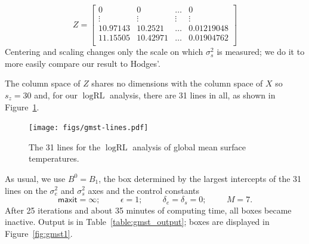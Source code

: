 \documentclass{report}
\newcommand{\textcompute}{\textsf}
\newcommand{\RLorig}{\text{RL}}
\newcommand{\logRLorig}{\log\RLorig}
\newcommand{\sigssq}{\sigma_s^2}
\newcommand{\sigesq}{\sigma_e^2}
\newcommand{\maxit}{\textcompute{maxit}}
\begin{document}
\begin{equation*}
Z =	\begin{bmatrix} 
		0 & 0 & \dots & 0\\
		\vdots & \vdots & \vdots & \vdots\\
		10.97143 & 10.2521 & \dots & 0.01219048\\
		11.15505 & 10.42971 & \dots & 0.01904762\\
	\end{bmatrix}
\end{equation*}
Centering and scaling changes only the scale on which $\sigssq$ is measured; we do it to more easily compare our result to Hodges'.

The column space of $Z$ shares no dimensions with the column space of $X$ so $s_z=30$ and, for our $\logRLorig$ analysis, there are 31 lines in all, as shown in Figure~\ref{fig:gmst-lines}.
\begin{figure}
	\centering
	\texttt{[image: figs/gmst-lines.pdf]}
	\caption{The 31 lines for the $\logRLorig$ analysis of
	              global mean surface temperatures.}
	\label{fig:gmst-lines}
\end{figure}
As usual, we use $B^0 = B_1$, the box determined by the largest intercepts of the 31 lines on the $\sigesq$ and $\sigssq$ axes and the control constants 
\begin{equation*}
	\maxit=\infty; \hspace{1cm} \epsilon=1; \hspace{1cm}
	\delta_e= \delta_s=0; \hspace{1cm} M=7.
\end{equation*}
After 25 iterations and about 35 minutes of computing time, all boxes became inactive.  Output is in Table~\ref{table:gmst_output}; boxes are displayed in Figure~\ref{fig:gmst1}.
\end{document}
